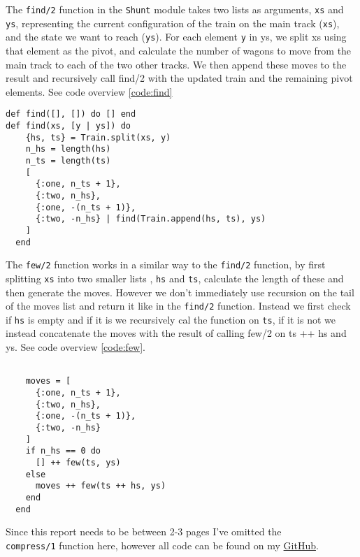\documentclass[a4paper,11pt]{article}
\newenvironment{code}{\captionsetup{type=listing}}{}
\begin{document}
The {\tt find/2} function in the {\tt Shunt} module takes two lists as arguments, {\tt xs} and {\tt ys}, representing the 
current configuration of the train on the main track ({\tt xs}), and the state we want to reach ({\tt ys}). For each 
element {\tt y} in ys, we split xs using that element as the pivot, and calculate the number of wagons to move from the 
main track to each of the two other tracks. We then append these moves to the result and recursively call find/2 with 
the updated train and the remaining pivot elements. See code overview \ref{code:find}
\begin{code}
\label{code:find}
\begin{verbatim}
def find([], []) do [] end
def find(xs, [y | ys]) do
    {hs, ts} = Train.split(xs, y)
    n_hs = length(hs)
    n_ts = length(ts)
    [
      {:one, n_ts + 1},
      {:two, n_hs},
      {:one, -(n_ts + 1)},
      {:two, -n_hs} | find(Train.append(hs, ts), ys)
    ]
  end
\end{verbatim}
\end{code}

The {\tt few/2} function works in a similar way to the {\tt find/2} function, by first splitting {\tt xs} into two smaller
lists , {\tt hs} and {\tt ts}, calculate the length of these and then generate the moves. However we don't immediately 
use recursion on the tail of the moves list and return it like in the {\tt find/2} function. Instead we first check if 
{\tt hs} is empty and if it is we recursively cal the function on {\tt ts}, if it is not we instead concatenate the moves 
with the result of calling few/2 on ts ++ hs and ys. See code overview \ref{code:few}.
\begin{code}
\label{code:few}
\begin{verbatim}

    moves = [
      {:one, n_ts + 1},
      {:two, n_hs},
      {:one, -(n_ts + 1)},
      {:two, -n_hs}
    ]
    if n_hs == 0 do
      [] ++ few(ts, ys)
    else
      moves ++ few(ts ++ hs, ys)
    end
  end
\end{verbatim}
\end{code}

Since this report needs to be between 2-3 pages I've omitted the \\{\tt compress/1} function here, however all code can 
be found on my \href{https://github.com/adrian-jonsson-sjoedin/ID1019-Programming-II/tree/main/Task7_Solution}{GitHub}.
\end{document}

